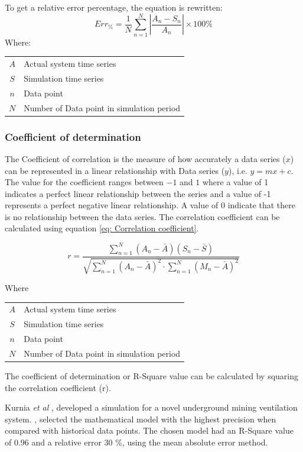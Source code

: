  			To get a relative error percentage, the equation is rewritten:	
 			\begin{equation}
 			\label{eq: Relative error}
 			Err_{\%} = \dfrac{1}{N}\sum_{n=1}^{N}{\left|\dfrac{A_{n} - S_{n}}{A_{n}}\right| }\times 100 \%
 			\end{equation}
 			Where: \par
 			\begin{table}[h!]
 				\centering
 				\begin{tabular}{cl}
 					$A$ & Actual system time series \\
 					$S$ & Simulation time series \\
 					$n$ & Data point \\
 					$N$ & Number of Data point in simulation period \\
 				\end{tabular} 
 			\end{table} 
 		\subsubsection{Coefficient of determination}
 		The Coefficient of correlation is the measure of how accurately a data series ($ x $) can be represented in a linear relationship with Data series ($ y $), i.e. $ y = mx+c$. The value for the coefficient ranges between $ -1 $ and $ 1 $ where a value of 1 indicates a perfect linear relationship between the series and a value of -1 represents a perfect negative linear relationship. A value of 0 indicate that there is no relationship between the data series. The correlation coefficient can be calculated using equation \cref{eq: Correlation coefficient}.\cite{sarin2010comparing}
 		
 		\begin{equation}
 		\label{eq: Correlation coefficient}
 		r = \dfrac{\sum_{n=1}^{N}(A_n - \bar{A})(S_n - \bar{S})}{\sqrt{\sum_{n=1}^{N}(A_n - \bar{A})^2 \cdot \sum_{n=1}^{N}(M_n - \bar{A})^2}}
 		\end{equation}
 		\par
 		Where \par
 		\begin{table}[h!]
 			\centering
 			\begin{tabular}{cl}
 				$A$ & Actual system time series \\
 				$S$ & Simulation time series \\
 				$n$ & Data point \\
 				$N$ & Number of Data point in simulation period \\
 			\end{tabular} 
 		\end{table}	
 		The coefficient of determination or R-Square value can be calculated by squaring the correlation coefficient (r). 
 		\par 
 			Kurnia \textit{et al} \cite{kurnia2014simulation},\cite{kurnia2014dust} developed a simulation for a novel underground mining ventilation system. \cite{kurnia2014simulation},\cite{kurnia2014dust} selected the mathematical model with the highest precision when compared with historical data points. The chosen model had an R-Square value of 0.96 and a relative error 30 \%, using the mean absolute error method. 
 			
